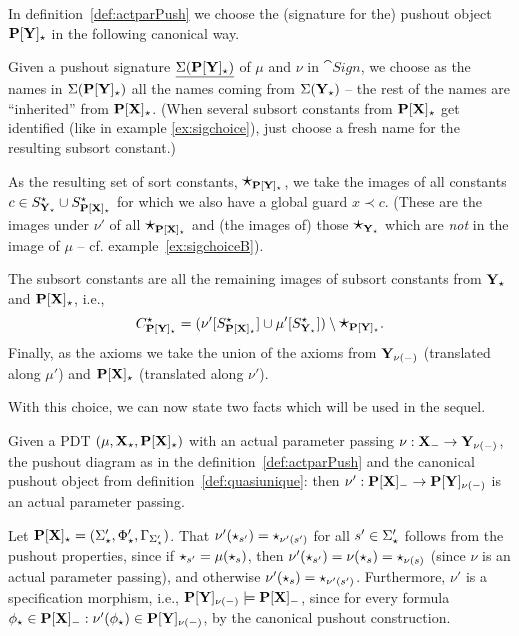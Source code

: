 \begin{definition}\label{def:quasiunique}
In definition~\ref{def:actparPush} we choose the (signature for the)
pushout object ${\bf P[Y]_\star}$ in the following canonical way. 

Given a pushout signature $\underline{\Sigma({\bf P[Y]_\star})}$ of $\mu$ and $\nu$ in
$\cat{Sign}$, we choose as the names in $\Sigma({\bf P[Y]_\star})$ all the names coming from $\Sigma({\bf Y}_\star)$ -- the rest of the names are ``inherited'' from ${\bf P[X]_\star}$. 
(When several subsort constants from ${\bf P[X]_\star}$ get identified (like in example
\ref{ex:sigchoice}), just choose a fresh name for the resulting subsort constant.)

As the resulting set of sort constants, 
$\mbox{\Large{$\star$}}_{{\bf P[Y]_{\star}}}$, we take the images of all constants
$c\in S^\star_{{\bf Y_{\star}}}\cup S^\star_{{\bf P[X]_{\star}}}$ for which we also have a
global guard $x\prec c$. (These are 
the images under $\nu'$ of all
$\mbox{\Large{$\star$}}_{{\bf P[X]_{\star}}}$ and (the images of) those
$\mbox{\Large{$\star$}}_{{\bf Y_{\star}}}$ which are {\em not} in the image of $\mu$ --
cf. example~\ref{ex:sigchoiceB}). 

The subsort constants are all the remaining images of subsort constants from
${\bf Y_\star}$ and ${\bf P[X]_\star}$, i.e., 
\[C^\star_{{\bf P[Y]_{\star}}} = (\nu'[S^\star_{{\bf P[X]_{\star}}}] \cup
\mu'[S^\star_{{\bf Y}_{\star}}]) \setminus \mbox{\Large{$\star$}}_{{\bf P[Y]_{\star}}}.
\]
Finally, as the axioms we take the union of the axioms from
${\bf Y_{\nu(-)}}$ (translated along $\mu'$) and ${\bf P[X]_\star}$ (translated along $\nu'$).
\end{definition}
%
With this choice, we can now state two facts which will
be used in the sequel.
%
\begin{lemma}\label{le:weakmu}
Given a PDT $(\mu,{\bf X_\star},{\bf P[X]_\star})$ with an actual parameter
passing $\nu: {\bf X_-} \to {\bf Y_{\nu(-)}}$,
the pushout diagram as in the definition~\ref{def:actparPush} and the
canonical pushout object from definition~\ref{def:quasiunique}:
then $\nu': {\bf P[X]_-} \to {\bf P[Y]_{\nu(-)}}$ is an actual
parameter passing. 
\end{lemma}
\begin{PROOF}
Let ${\bf P[X]_\star}= (\Sigma_\star',\Phi'_\star,\Gamma_{\Sigma'_{\star}})$.
That $\nu'(\star_{s'}) = \star_{\nu'(s')}$ for all $s' \in \Sigma_\star'$
follows from the pushout properties, since if $\star_{s'} = \mu(\star_s)$, then
$\nu'(\star_{s'})= \nu(\star_s)= \star_{\nu(s)}$ (since $\nu$ is an actual
parameter passing), and otherwise $\nu'(\star_s) =
\star_{\nu'(s')}$. Furthermore, $\nu'$ is a specification morphism, i.e.,
${\bf P[Y]_{\nu(-)}} \models {\bf P[X]_-}$,  since
for every formula $\phi_\star \in {\bf P[X]_-}:\nu'(\phi_\star) \in
{\bf P[Y]_{\nu(-)}}$, by the canonical pushout construction.
\end{PROOF}
